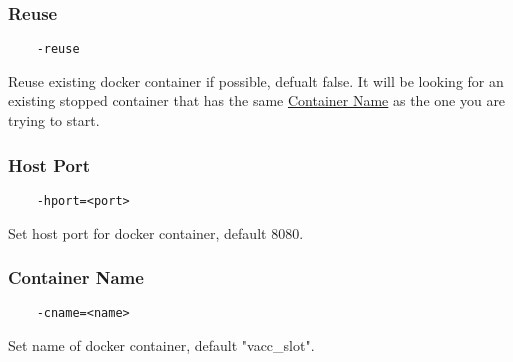 \subsubsection{Reuse}
\begin{verbatim}
    -reuse
\end{verbatim}
Reuse existing docker container if possible, defualt false. It will be looking for an existing stopped container that has the same \hyperref[ref:ContainerName]{Container Name} as the one you are trying to start.

\subsubsection{Host Port}
\begin{verbatim}
    -hport=<port>
\end{verbatim}
Set host port for docker container, default 8080.

\subsubsection{Container Name}\label{ref:ContainerName}
\begin{verbatim}
    -cname=<name>
\end{verbatim}
Set name of docker container, default "vacc{\_}slot".